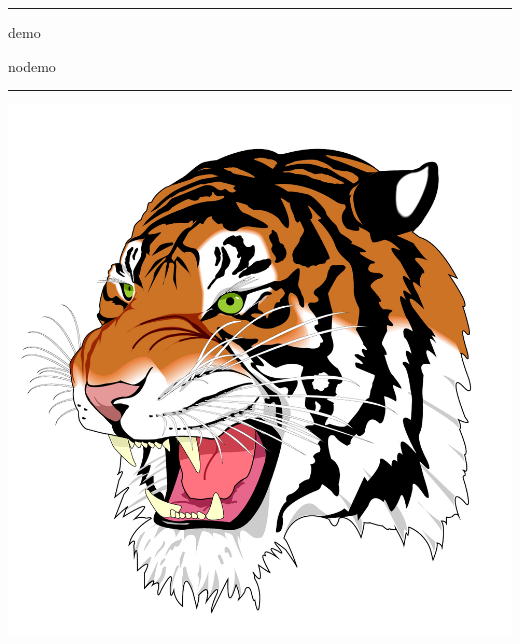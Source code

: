 \documentclass[a4paper,demo,\myClassOptions]{article}
\begin{document}
\hrule
\begin{description}
  \Large
  \item[graphicx:] demo
  \item[pdfpages:] nodemo
\end{description}
\hrule

\tableofcontents
\includegraphics[scale=.4]{pdf/tiger.pdf}


\end{document}
